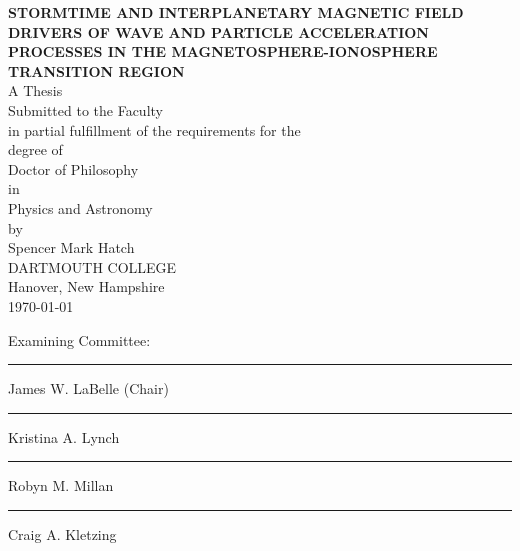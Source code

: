 \begin{titlepage}
 \begin{center}
   \MakeUppercase{\bf Stormtime and interplanetary magnetic field
     drivers of wave and particle acceleration processes in the
     magnetosphere-ionosphere transition region}
   \\ %
   A Thesis                 \\
   Submitted to the Faculty \\
   in partial fulfillment of the requirements for the \\
   degree of              \\
   Doctor of Philosophy   \\ %
   in                     \\
   Physics and Astronomy  \\ %
   by                     \\
   Spencer Mark Hatch \\ %
   DARTMOUTH COLLEGE      \\
   Hanover, New Hampshire \\
   \today
 \end{center}
 \vspace{\baselineskip}
 
 \vspace*{\fill}
 
 \begin{minipage}[b]{\linewidth}
 
    \begin{flushright}
        
        \begin{minipage}[b]{0.45\linewidth}
            \begin{center}
                Examining Committee:
            \end{center}
            \vspace{0.5in}
            \hrule \vspace{0.1in}
            James W. LaBelle (Chair) \\ \vspace{0.3in} %
            \hrule \vspace{0.1in}
            Kristina A. Lynch \\ \vspace{0.3in}           %
            \hrule \vspace{0.1in}
            Robyn M. Millan \\ \vspace{0.3in}       %
            \hrule \vspace{0.1in} 
            Craig A. Kletzing                        %
        \end{minipage}
    \end{flushright}
 

\end{minipage}
\end{titlepage}
